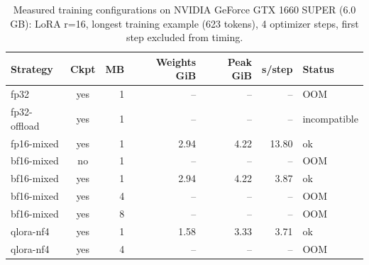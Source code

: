 \begin{table}[t]
\centering
\footnotesize
\caption{Measured training configurations on NVIDIA GeForce GTX 1660 SUPER (6.0 GB): LoRA r=16, longest training example (623 tokens), 4 optimizer steps, first step excluded from timing.}
\label{tab:membench}
\begin{tabular}{lcrrrrl}
\toprule
Strategy & Ckpt & MB & Weights GiB & Peak GiB & s/step & Status \\
\midrule
fp32 & yes & 1 & -- & -- & -- & OOM \\
fp32-offload & yes & 1 & -- & -- & -- & incompatible \\
fp16-mixed & yes & 1 & 2.94 & 4.22 & 13.80 & ok \\
bf16-mixed & no & 1 & -- & -- & -- & OOM \\
bf16-mixed & yes & 1 & 2.94 & 4.22 & 3.87 & ok \\
bf16-mixed & yes & 4 & -- & -- & -- & OOM \\
bf16-mixed & yes & 8 & -- & -- & -- & OOM \\
qlora-nf4 & yes & 1 & 1.58 & 3.33 & 3.71 & ok \\
qlora-nf4 & yes & 4 & -- & -- & -- & OOM \\
\bottomrule
\end{tabular}
\end{table}
